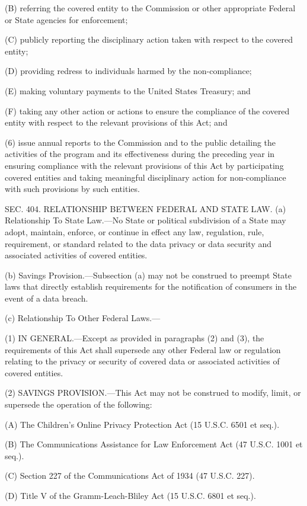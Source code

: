(B) referring the covered entity to the Commission or other appropriate Federal or State agencies for enforcement;

(C) publicly reporting the disciplinary action taken with respect to the covered entity;

(D) providing redress to individuals harmed by the non-compliance;

(E) making voluntary payments to the United States Treasury; and

(F) taking any other action or actions to ensure the compliance of the covered entity with respect to the relevant provisions of this Act; and

(6) issue annual reports to the Commission and to the public detailing the activities of the program and its effectiveness during the preceding year in ensuring compliance with the relevant provisions of this Act by participating covered entities and taking meaningful disciplinary action for non-compliance with such provisions by such entities.


SEC. 404. RELATIONSHIP BETWEEN FEDERAL AND STATE LAW.
(a) Relationship To State Law.—No State or political subdivision of a State may adopt, maintain, enforce, or continue in effect any law, regulation, rule, requirement, or standard related to the data privacy or data security and associated activities of covered entities.

(b) Savings Provision.—Subsection (a) may not be construed to preempt State laws that directly establish requirements for the notification of consumers in the event of a data breach.

(c) Relationship To Other Federal Laws.—

(1) IN GENERAL.—Except as provided in paragraphs (2) and (3), the requirements of this Act shall supersede any other Federal law or regulation relating to the privacy or security of covered data or associated activities of covered entities.

(2) SAVINGS PROVISION.—This Act may not be construed to modify, limit, or supersede the operation of the following:

(A) The Children’s Online Privacy Protection Act (15 U.S.C. 6501 et seq.).

(B) The Communications Assistance for Law Enforcement Act (47 U.S.C. 1001 et seq.).

(C) Section 227 of the Communications Act of 1934 (47 U.S.C. 227).

(D) Title V of the Gramm-Leach-Bliley Act (15 U.S.C. 6801 et seq.).

